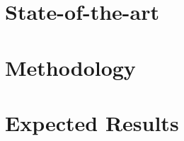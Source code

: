 
\section{State-of-the-art}
\label{sec:state-of-the-art}

%
% 


\section{Methodology}
\label{sec:methodology}



\section{Expected Results}
\label{sec:expected-results}


